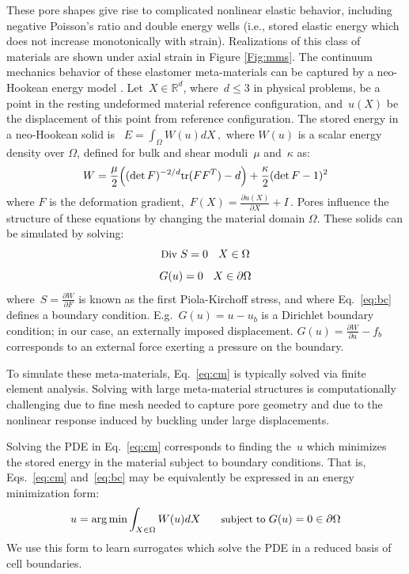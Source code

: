 These pore shapes give rise to complicated nonlinear elastic behavior, including negative Poisson's ratio and double energy wells (i.e., stored elastic energy which does not increase monotonically with strain).
Realizations of this class of materials are shown under axial strain in Figure \ref{Fig:mms}. The continuum mechanics behavior of these elastomer meta-materials can be captured by a neo-Hookean energy model \citep{ogden1997non}.
Let~${X \in \mathbb{R}^d}$, where~${d\leq 3}$ in physical problems, be a point in the resting undeformed material reference configuration, and~$u(X)$ be the displacement of this point from reference configuration. The stored energy in a neo-Hookean solid is
~${E = \int_{\Omega} W(u) dX\,,}$
where $W(u)$ is a scalar energy density over $\Omega$, defined for bulk and shear moduli~$\mu$ and~$\kappa$ as:
\begin{equation}\label{eq:neohookean}\small
   W = \frac{\mu}{2} \Big( (\det F)^{-2/d} \text{tr}(FF^T) - d\Big) + \frac{\kappa}{2} (\det F - 1)^2
\end{equation}
where $F$ is the deformation gradient,~${F(X) = \frac{\partial u(X)}{\partial X} + I\,.}$
Pores influence the structure of these equations by changing the material domain $\Omega$.
These solids can be simulated by solving:
\begin{equation}\label{eq:cm}\small
    \text{Div } S = 0 \quad X \in \Omega
\end{equation} \vspace{-0.4cm}
\begin{equation}\label{eq:bc}\small
    G(u) = 0 \quad X \in \partial \Omega
\end{equation}
where~${S = \frac{\partial W}{\partial F}}$ is known as the first Piola-Kirchoff stress, and where Eq.~\ref{eq:bc} defines a boundary condition.
E.g.~${G(u) = u - u_b}$ is a Dirichlet boundary condition; in our case, an externally imposed displacement. ${G(u) = \frac{\partial W}{\partial u} - f_b}$ corresponds to an external force exerting a pressure on the boundary.

To simulate these meta-materials, Eq.~\ref{eq:cm} is typically solved via finite element analysis.
Solving with large meta-material structures is computationally challenging due to fine mesh needed to capture pore geometry and due to the nonlinear response induced by buckling under large displacements.

Solving the PDE in Eq.~\ref{eq:cm} corresponds to finding the~$u$ which minimizes the stored energy in the material subject to boundary conditions.
That is, Eqs.~\ref{eq:cm} and~\ref{eq:bc} may be equivalently be expressed in an energy minimization form:
\begin{equation}\label{eq:cm-energy}\small
    		u = \operatorname*{arg\,min} \int_{X \in \Omega}  W(u) dX \quad \quad\text{subject to } G(u) = 0 \in \partial\Omega
\end{equation}
We use this form to learn surrogates which solve the PDE in a reduced basis of cell boundaries.

